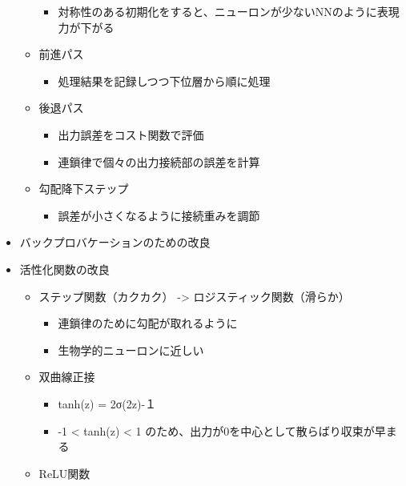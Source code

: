 \begin{itemize}
\begin{itemize}
    \begin{itemize}
    \tightlist
    \item
      対称性のある初期化をすると、ニューロンが少ないNNのように表現力が下がる
    \end{itemize}
  \item
    前進パス

    \begin{itemize}
    \tightlist
    \item
      処理結果を記録しつつ下位層から順に処理
    \end{itemize}
  \item
    後退パス

    \begin{itemize}
    \tightlist
    \item
      出力誤差をコスト関数で評価
    \item
      連鎖律で個々の出力接続部の誤差を計算
    \end{itemize}
  \item
    勾配降下ステップ

    \begin{itemize}
    \tightlist
    \item
      誤差が小さくなるように接続重みを調節
    \end{itemize}
  \end{itemize}
\item
  バックプロバケーションのための改良
\item
  活性化関数の改良

  \begin{itemize}
  \tightlist
  \item
    ステップ関数（カクカク） -\textgreater{}
    ロジスティック関数（滑らか）

    \begin{itemize}
    \tightlist
    \item
      連鎖律のために勾配が取れるように
    \item
      生物学的ニューロンに近しい
    \end{itemize}
  \item
    双曲線正接

    \begin{itemize}
    \tightlist
    \item
      tanh(z) = 2σ(2z)-１
    \item
      -1 \textless{} tanh(z) \textless{} 1
      のため、出力が0を中心として散らばり収束が早まる
    \end{itemize}
  \item
    ReLU関数


\end{itemize}
\end{itemize}
